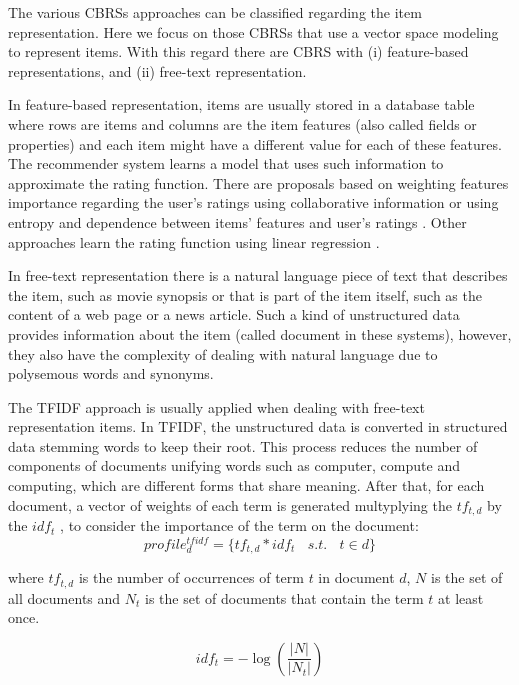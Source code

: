 \documentclass[preprint]{elsarticle}
\begin{document}
\begin{spacing}{1.5}
The various CBRSs approaches can be classified regarding the item representation. Here we focus on those CBRSs that use a vector space modeling to represent items. With this regard there are CBRS with (i) feature-based representations, and (ii) free-text representation.

In feature-based representation, items are usually stored in a database table where rows are items and columns are the item features (also called fields or properties) and each item might have a different value for each of these features. The recommender system learns a model that uses such information to approximate the rating function. There are proposals based on weighting features importance regarding the user's ratings using collaborative information \cite{Symeonidis2007} or using entropy and dependence between items' features and user's ratings \cite{Castro2014}. Other approaches learn the rating function using linear regression \cite{DePessemier2016}.

In free-text representation there is a natural language piece of text that describes the item, such as movie synopsis or that is part of the item itself, such as the content of a web page or a news article. Such a kind of unstructured data provides information about the item (called document in these systems), however, they also have the complexity of dealing with natural language due to polysemous words and synonyms.

The TFIDF approach \cite{Erra2015} is usually applied when dealing with free-text representation items. In TFIDF, the unstructured data is converted in structured data stemming words \cite{Porter1980} to keep their root. This process reduces the number of components of documents unifying words such as computer, compute and computing, which are different forms that share meaning. After that, for each document, a vector of weights of each term is generated multyplying the $tf_{t,d}$ by the $idf_{t}$ \cite{Lops2011}, to consider the importance of the term on the document:
\begin{equation}
	profile^{tfidf}_{d} = \{tf_{t,d}*idf_{t}~~~~s.t.~~~~ t \in d \}
	\label{eq:document-profile-tfidf}
\end{equation}

\noindent where $tf_{t,d}$ is the number of occurrences of term $t$ in document $d$, $N$ is the set of all documents and $N_t$ is the set of documents that contain the term $t$ at least once.

\begin{equation}
	idf_t = -\log \left( \frac{|N|}{|N_t|}\right)
	\label{eq:document-profile-tfidf-idf}
\end{equation}


\end{spacing}
\end{document}
